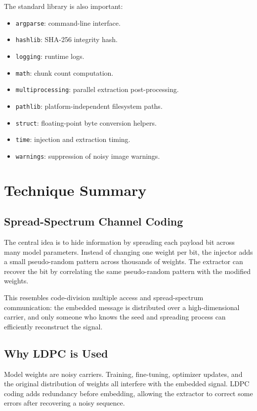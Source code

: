 \documentclass[11pt,a4paper]{article}
\newcommand{\code}[1]{\texttt{#1}}
\begin{document}
The standard library is also important:

\begin{itemize}[leftmargin=1.4em]
  \item \code{argparse}: command-line interface.
  \item \code{hashlib}: SHA-256 integrity hash.
  \item \code{logging}: runtime logs.
  \item \code{math}: chunk count computation.
  \item \code{multiprocessing}: parallel extraction post-processing.
  \item \code{pathlib}: platform-independent filesystem paths.
  \item \code{struct}: floating-point byte conversion helpers.
  \item \code{time}: injection and extraction timing.
  \item \code{warnings}: suppression of noisy image warnings.
\end{itemize}

\section{Technique Summary}

\subsection{Spread-Spectrum Channel Coding}

The central idea is to hide information by spreading each payload bit across many model parameters. Instead of changing one weight per bit, the injector adds a small pseudo-random pattern across thousands of weights. The extractor can recover the bit by correlating the same pseudo-random pattern with the modified weights.

This resembles code-division multiple access and spread-spectrum communication: the embedded message is distributed over a high-dimensional carrier, and only someone who knows the seed and spreading process can efficiently reconstruct the signal.

\subsection{Why LDPC is Used}

Model weights are noisy carriers. Training, fine-tuning, optimizer updates, and the original distribution of weights all interfere with the embedded signal. LDPC coding adds redundancy before embedding, allowing the extractor to correct some errors after recovering a noisy sequence.
\end{document}
